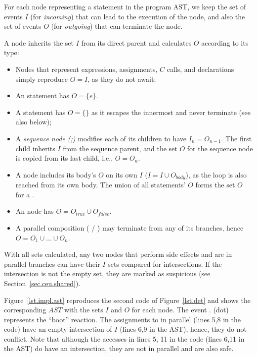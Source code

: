 For each node representing a statement in the program AST, we keep the set of 
events $I$ (for \emph{incoming}) that can lead to the execution of the node, 
and also the set of events $O$ (for \emph{outgoing}) that can terminate the 
node.

A node inherits the set $I$ from its direct parent and calculates $O$ according 
to its type:
%
\begin{itemize}
%
\item Nodes that represent expressions, assignments, $C$ calls, and 
declarations simply reproduce $O=I$, as they do not await;
%
\item An  statement has $O=\{e\}$.
%
\item A  statement has $O=\{\}$ as it escapes the innermost 
 and never terminate (see also  below);
%
\item A \emph{sequence node (;)} modifies each of its children to have 
$I_n=O_{n-1}$.
The first child inherits $I$ from the sequence parent, and the set $O$ for the 
sequence node is copied from its last child, i.e., $O=O_n$.
%
\item A  node includes its body's $O$ on its own $I$ ($I=I \cup 
O_{body}$), as the loop is also reached from its own body.
The union of all  statements' $O$ forms the set $O$ for a 
.
%
\item An  node has $O=O_{true} \cup O_{false}$.
%
\item A parallel composition ( / ) may terminate 
from any of its branches, hence $O = O_1 \cup ... \cup O_n$.
\end{itemize}

With all sets calculated, any two nodes that perform side effects and are in 
parallel branches can have their $I$ sets compared for intersections.
If the intersection is not the empty set, they are marked as suspicious (see 
Section~\ref{sec.ceu.shared}).

Figure~\ref{lst.impl.ast} reproduces the second code of Figure~\ref{lst.det} 
and shows the corresponding $AST$ with the sets $I$ and $O$ for each node.
The event $.$ (dot) represents the ``boot'' reaction.
The assignments to  in parallel (lines 5,8 in the code) have an empty 
intersection of $I$ (lines 6,9 in the AST), hence, they do not conflict.
Note that although the accesses in lines 5, 11 in the code (lines 6,11 in the 
AST) do have an intersection, they are not in parallel and are also safe.

